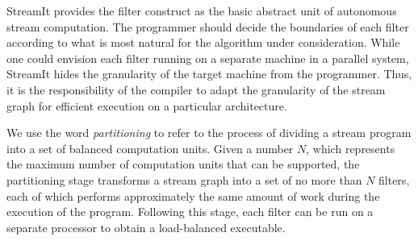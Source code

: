 StreamIt provides the filter construct as the basic abstract unit of
autonomous stream computation.  The programmer should decide the
boundaries of each filter according to what is most natural for the
algorithm under consideration.  While one could envision each filter
running on a separate machine in a parallel system, StreamIt hides the
granularity of the target machine from the programmer.  Thus, it is
the responsibility of the compiler to adapt the granularity of the
stream graph for efficient execution on a particular architecture.

We use the word {\it partitioning} to refer to the process of dividing
a stream program into a set of balanced computation units.  Given a
number $N$, which represents the maximum number of computation units
that can be supported, the partitioning stage transforms a stream
graph into a set of no more than $N$ filters, each of which performs
approximately the same amount of work during the execution of the
program.  Following this stage, each filter can be run on a separate
processor to obtain a load-balanced executable.


